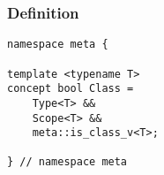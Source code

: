 
\subsubsection{Definition}

\begin{verbatim}
namespace meta {

template <typename T>
concept bool Class =
	Type<T> &&
	Scope<T> &&
	meta::is_class_v<T>;

} // namespace meta
\end{verbatim}
